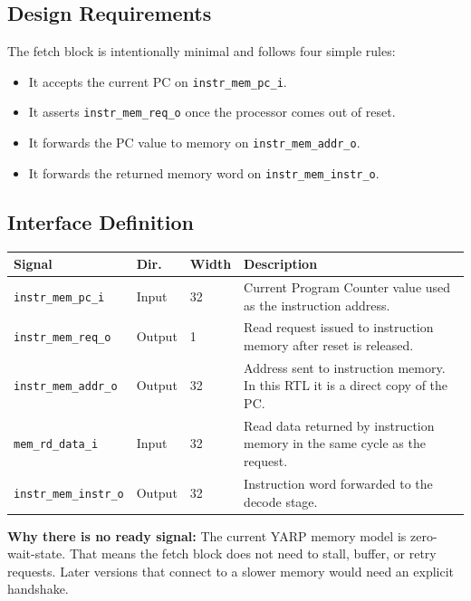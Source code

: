 \documentclass[12pt, a4paper, oneside]{book}
\begin{document}
\subsection{Design Requirements}

The fetch block is intentionally minimal and follows four simple rules:
\begin{itemize}
  \item It accepts the current PC on \texttt{instr\_mem\_pc\_i}.
  \item It asserts \texttt{instr\_mem\_req\_o} once the processor comes out of reset.
  \item It forwards the PC value to memory on \texttt{instr\_mem\_addr\_o}.
  \item It forwards the returned memory word on \texttt{instr\_mem\_instr\_o}.
\end{itemize}

\subsection{Interface Definition}

\begin{center}
\renewcommand{\arraystretch}{1.3}
\begin{tabular}{p{4.0cm} p{1.7cm} p{1.4cm} p{7.2cm}}
\toprule
\textbf{\color{purple}Signal} & \textbf{\color{purple}Dir.} & \textbf{\color{purple}Width} & \textbf{\color{purple}Description} \\
\midrule
\texttt{instr\_mem\_pc\_i}    & Input  & 32 & Current Program Counter value used as the instruction address. \\
\texttt{instr\_mem\_req\_o}   & Output & 1  & Read request issued to instruction memory after reset is released. \\
\texttt{instr\_mem\_addr\_o}  & Output & 32 & Address sent to instruction memory. In this RTL it is a direct copy of the PC. \\
\texttt{mem\_rd\_data\_i}     & Input  & 32 & Read data returned by instruction memory in the same cycle as the request. \\
\texttt{instr\_mem\_instr\_o} & Output & 32 & Instruction word forwarded to the decode stage. \\
\bottomrule
\end{tabular}
\end{center}

\begin{infobox}
\textbf{\color{accentblue}Why there is no ready signal:}
The current YARP memory model is zero-wait-state. That means the fetch block does not need to stall, buffer, or retry requests. Later versions that connect to a slower memory would need an explicit handshake.
\end{infobox}
\end{document}
